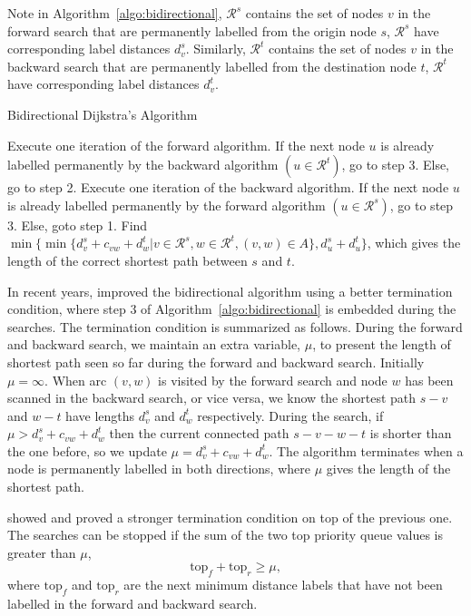 Note in Algorithm~\ref{algo:bidirectional},
$\mathcal{R}^s$ contains the set of nodes $v$ in the forward search that are permanently labelled from the origin node $s$,
$\mathcal{R}^s$ have corresponding label distances $d_v^s$.
Similarly, $\mathcal{R}^t$ contains the set of nodes $v$ in the backward search that are permanently labelled from the destination node $t$,
$\mathcal{R}^t$ have corresponding label distances $d_v^t$.

\begin{algorithm}[H]
    \caption{Bidirectional Dijkstra's Algorithm}
    \label{algo:bidirectional}
    \begin{algorithmic}[1]
        \State Execute one iteration of the forward algorithm.
        If the next node $u$ is already labelled permanently by the 
        backward algorithm $(u\in\mathcal{R}^t)$, go to step 3.
        Else, go to step 2.
        \State Execute one iteration of the backward algorithm.
        If the next node $u$ is already labelled permanently by the
        forward algorithm $(u\in\mathcal{R}^s)$, go to step 3.
        Else, goto step 1.
        \State Find $\min\{\min\{d_v^s + c_{vw} + d_w^t | v \in \mathcal{R}^s, w \in \mathcal{R}^t, (v, w) \in A\}, d_u^s + d_u^t\}$, which gives the length of the correct shortest path between $s$ and $t$.
    \EndProcedure
\end{algorithmic}
\end{algorithm}

In recent years,
\citet{Goldberg05} improved the bidirectional algorithm using a better termination condition,
where step 3 of Algorithm~\ref{algo:bidirectional} is embedded during the searches.
The termination condition is summarized as follows.
During the forward and backward search,
we maintain an extra variable, $\mu$, to present the length of shortest path seen so far during the forward and backward search.
Initially $\mu = \infty$.
When arc $(v,w)$ is visited by the forward search and node $w$ has been scanned in the backward search, or vice versa,
we know the shortest path $s-v$ and $w-t$ have lengths $d_v^s$ and $d_w^t$ respectively.
During the search, if $\mu > d_v^s + c_{vw} + d_w^t$ then the current connected path $s-v-w-t$ is shorter than the one before, 
so we update $\mu = d_v^s + c_{vw} + d_w^t$.
The algorithm terminates when a node is permanently labelled in both directions,
where $\mu$ gives the length of the shortest path.

\citet{GoldbergEPP} showed and proved a stronger termination condition on top of the previous one.
The searches can be stopped if the sum of the two top priority queue values is greater than $\mu$,
\[
    \text{top}_f + \text{top}_r \geq \mu,
\]
where $\text{top}_f$ and $\text{top}_r$ are the next minimum distance labels that have not been labelled in the forward and backward search.

